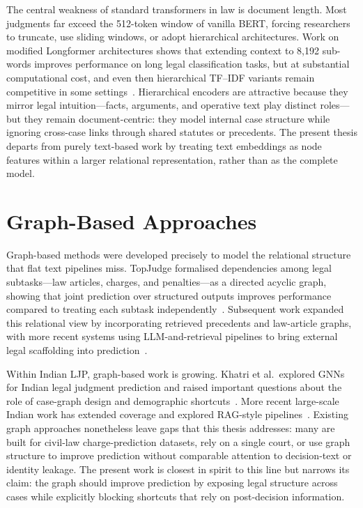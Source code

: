 The central weakness of standard transformers in law is document length. Most judgments far exceed the 512-token window of vanilla BERT, forcing researchers to truncate, use sliding windows, or adopt hierarchical architectures. Work on modified Longformer architectures shows that extending context to 8,192 sub-words improves performance on long legal classification tasks, but at substantial computational cost, and even then hierarchical TF--IDF variants remain competitive in some settings~\cite{mamakas2022longlegal}. Hierarchical encoders are attractive because they mirror legal intuition---facts, arguments, and operative text play distinct roles---but they remain document-centric: they model internal case structure while ignoring cross-case links through shared statutes or precedents. The present thesis departs from purely text-based work by treating text embeddings as node features within a larger relational representation, rather than as the complete model.

\section{Graph-Based Approaches}

Graph-based methods were developed precisely to model the relational structure that flat text pipelines miss. TopJudge formalised dependencies among legal subtasks---law articles, charges, and penalties---as a directed acyclic graph, showing that joint prediction over structured outputs improves performance compared to treating each subtask independently~\cite{zhong2018topjudge}. Subsequent work expanded this relational view by incorporating retrieved precedents and law-article graphs, with more recent systems using LLM-and-retrieval pipelines to bring external legal scaffolding into prediction~\cite{wu2023pljp, santosh2024precedents}.

Within Indian LJP, graph-based work is growing. Khatri et al.\ explored GNNs for Indian legal judgment prediction and raised important questions about the role of case-graph design and demographic shortcuts~\cite{khatri2023indianGNN}. More recent large-scale Indian work has extended coverage and explored RAG-style pipelines~\cite{nigam2025nyayaanumana}. Existing graph approaches nonetheless leave gaps that this thesis addresses: many are built for civil-law charge-prediction datasets, rely on a single court, or use graph structure to improve prediction without comparable attention to decision-text or identity leakage. The present work is closest in spirit to this line but narrows its claim: the graph should improve prediction by exposing legal structure across cases while explicitly blocking shortcuts that rely on post-decision information.

